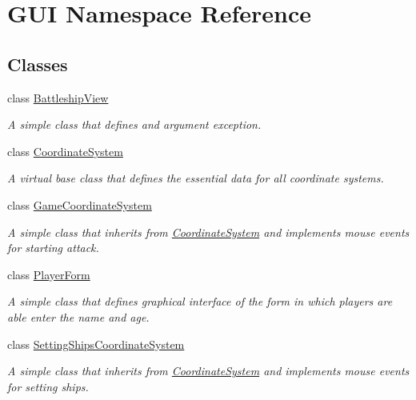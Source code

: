 \hypertarget{namespaceGUI}{}\section{G\+UI Namespace Reference}
\label{namespaceGUI}
\subsection*{Classes}
\begin{DoxyCompactItemize}
\item 
class \hyperlink{classGUI_1_1BattleshipView}{Battleship\+View}
\begin{DoxyCompactList}\small\item\em A simple class that defines and argument exception. \end{DoxyCompactList}\item 
class \hyperlink{classGUI_1_1CoordinateSystem}{Coordinate\+System}
\begin{DoxyCompactList}\small\item\em A virtual base class that defines the essential data for all coordinate systems. \end{DoxyCompactList}\item 
class \hyperlink{classGUI_1_1GameCoordinateSystem}{Game\+Coordinate\+System}
\begin{DoxyCompactList}\small\item\em A simple class that inherits from \hyperlink{classGUI_1_1CoordinateSystem}{Coordinate\+System} and implements mouse events for starting attack. \end{DoxyCompactList}\item 
class \hyperlink{classGUI_1_1PlayerForm}{Player\+Form}
\begin{DoxyCompactList}\small\item\em A simple class that defines graphical interface of the form in which players are able enter the name and age. \end{DoxyCompactList}\item 
class \hyperlink{classGUI_1_1SettingShipsCoordinateSystem}{Setting\+Ships\+Coordinate\+System}
\begin{DoxyCompactList}\small\item\em A simple class that inherits from \hyperlink{classGUI_1_1CoordinateSystem}{Coordinate\+System} and implements mouse events for setting ships. \end{DoxyCompactList}\end{DoxyCompactItemize}
